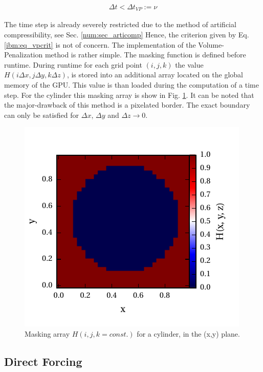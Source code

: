 \begin{align}
    \label{ibm:eq_vpcrit}
    \Delta t < \Delta t_{VP} := \nu
\end{align}

The time step is already severely restricted due to the method of artificial compressibility, see Sec. \ref{num:sec_articomp}
Hence, the criterion given by Eq. \ref{ibm:eq_vpcrit} is not of concern.
The implementation of the Volume-Penalization method is rather simple.
The masking function is defined before runtime.
During runtime for each grid point ${(i, j, k)}$ the value ${H(i\Delta x, j\Delta y, k \Delta z)}$,
is stored into an additional array located on the global memory of the GPU.
This value is than loaded during the computation of a time step.
For the cylinder this masking array is show in Fig. \ref{fig:ibm_maskvolpen}.
It can be noted that the major-drawback of this method is a pixelated border.
The exact boundary can only be satisfied for $\Delta x$, $\Delta y$ and $\Delta z \rightarrow 0$.

\begin{figure}[!t]
    \centering
    \includegraphics{gfx/immersed_boundary/methods/mask_volpen.pdf}
    \caption{Masking array $H(i,j,k=const.)$ for a cylinder, in the (x,y) plane.}
    \label{fig:ibm_maskvolpen}
\end{figure}

\subsection{Direct Forcing}
\label{chap:ibm_dirforce}

